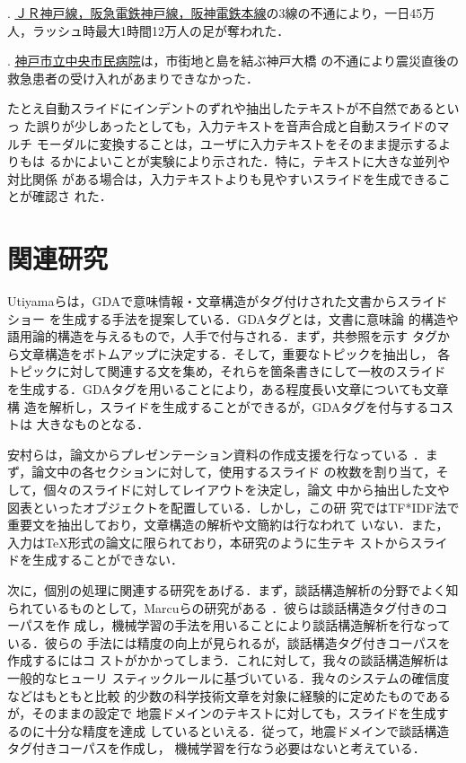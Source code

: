 \ex.  \underline{\underline{ＪＲ神戸線，阪急電鉄神戸線，阪神電鉄本線}}の3線の不通により，一日45万人，ラッシュ時最大1時間12万人の足が奪われた．

\ex. 
\underline{\underline{神戸市立中央市民病院}}は，市街地と島を結ぶ神戸大橋
の不通により震災直後の救急患者の受け入れがあまりできなかった．

たとえ自動スライドにインデントのずれや抽出したテキストが不自然であるといっ
た誤りが少しあったとしても，入力テキストを音声合成と自動スライドのマルチ
モーダルに変換することは，ユーザに入力テキストをそのまま提示するよりもは
るかによいことが実験により示された．特に，テキストに大きな並列や対比関係
がある場合は，入力テキストよりも見やすいスライドを生成できることが確認さ
れた．


\section{関連研究}
\label{sec:related_work}

Utiyamaらは，GDAで意味情報・文章構造がタグ付けされた文書からスライドショー
を生成する手法を提案している\cite{Utiyama99}．GDAタグとは，文書に意味論
的構造や語用論的構造を与えるもので，人手で付与される．まず，共参照を示す
タグから文章構造をボトムアップに決定する．そして，重要なトピックを抽出し，
各トピックに対して関連する文を集め，それらを箇条書きにして一枚のスライド
を生成する．GDAタグを用いることにより，ある程度長い文章についても文章構
造を解析し，スライドを生成することができるが，GDAタグを付与するコストは
大きなものとなる．

安村らは，論文からプレゼンテーション資料の作成支援を行なっている
\cite{Yasumura03j}．まず，論文中の各セクションに対して，使用するスライド
の枚数を割り当て，そして，個々のスライドに対してレイアウトを決定し，論文
中から抽出した文や図表といったオブジェクトを配置している．しかし，この研
究ではTF*IDF法で重要文を抽出しており，文章構造の解析や文簡約は行なわれて
いない．また，入力は\TeX 形式の論文に限られており，本研究のように生テキ
ストからスライドを生成することができない．

次に，個別の処理に関連する研究をあげる．まず，談話構造解析の分野でよく知
られているものとして，Marcuらの研究がある
\cite{Marcu99b,Marcu00,Carlson01}．彼らは談話構造タグ付きのコーパスを作
成し，機械学習の手法を用いることにより談話構造解析を行なっている．彼らの
手法には精度の向上が見られるが，談話構造タグ付きコーパスを作成するにはコ
ストがかかってしまう．これに対して，我々の談話構造解析は一般的なヒューリ
スティックルールに基づいている．我々のシステムの確信度などはもともと比較
的少数の科学技術文章を対象に経験的に定めたものであるが，そのままの設定で
地震ドメインのテキストに対しても，スライドを生成するのに十分な精度を達成
しているといえる．従って，地震ドメインで談話構造タグ付きコーパスを作成し，
機械学習を行なう必要はないと考えている．

